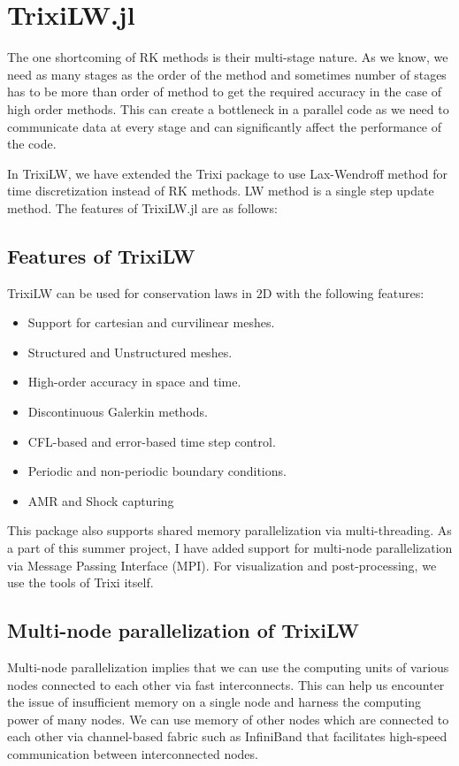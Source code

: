 \section{{\ttfamily TrixiLW.jl}}
The one shortcoming of RK methods is their multi-stage nature. As we know, we need as many stages as the order of the method and sometimes number of stages has to be more than order of method to get the required accuracy in the case of high order methods. This can create a bottleneck in a parallel code as we need to communicate data at every stage and can significantly affect the performance of the code. 

In {\ttfamily TrixiLW}, we have extended the {\ttfamily Trixi} package to use Lax-Wendroff method for time discretization instead of RK methods. LW method is a single step update method. The features of {\ttfamily TrixiLW.jl} are as follows:

\subsection{Features of {\ttfamily TrixiLW}}
{\ttfamily TrixiLW} can be used for conservation laws in $2$D with the following features:
\begin{itemize}
    \item Support for cartesian and curvilinear meshes.
    \item Structured and Unstructured meshes.
    \item High-order accuracy in space and time.
    \item Discontinuous Galerkin methods.
    \item CFL-based and error-based time step control.
    \item Periodic and non-periodic boundary conditions.
    \item AMR and Shock capturing
\end{itemize}
This package also supports shared memory parallelization via multi-threading. As a part of this summer project, I have added support for multi-node parallelization via {\ttfamily Message Passing Interface (MPI)}. For visualization and post-processing, we use the tools of {\ttfamily Trixi} itself.

\subsection{Multi-node parallelization of {\ttfamily TrixiLW}}
Multi-node parallelization implies that we can use the computing units of \linebreak various nodes connected to each other via fast interconnects. This can help us encounter the issue of insufficient memory on a single node and harness the \linebreak computing power of many nodes. We can use memory of other nodes which are connected to each other via channel-based fabric such as {\ttfamily InfiniBand} that facilitates high-speed communication between interconnected nodes. 

